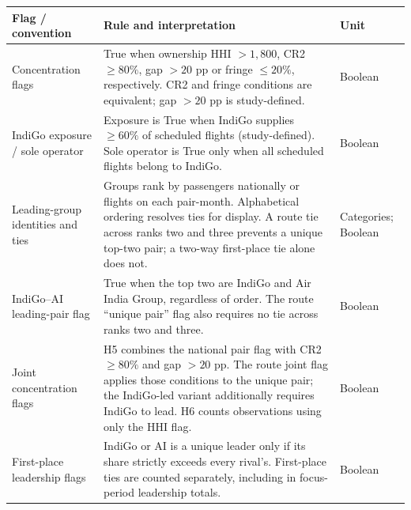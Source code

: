 \begin{minipage}{\linewidth}
\captionsetup{font=small,labelfont=bf,justification=raggedright,singlelinecheck=false,hypcap=false}
\label{tab:o4-dictionary-flags}
\centering
{\footnotesize{}\setlength{\tabcolsep}{4pt}\fontsize{10}{12}\selectfont{}\setlength{\tabcolsep}{3pt}
\renewcommand{\arraystretch}{1.15}
\begin{tabular}{|>{\raggedright\arraybackslash}p{}|>{\raggedright\arraybackslash}p{}|>{\raggedright\arraybackslash}p{}|}
\hline
\textbf{Flag / convention} & \textbf{Rule and interpretation} & \textbf{Unit} \\
\hline
Concentration flags & True when ownership HHI $>1{,}800$, CR2 $\geq80\%$, gap $>20$ pp or fringe $\leq20\%$, respectively. CR2 and fringe conditions are equivalent; gap $>20$ pp is study-defined. & Boolean \\
\hline
IndiGo exposure / sole operator & Exposure is True when IndiGo supplies $\geq60\%$ of scheduled flights (study-defined). Sole operator is True only when all scheduled flights belong to IndiGo. & Boolean \\
\hline
Leading-group identities and ties & Groups rank by passengers nationally or flights on each pair-month. Alphabetical ordering resolves ties for display. A route tie across ranks two and three prevents a unique top-two pair; a two-way first-place tie alone does not. & Categories; Boolean \\
\hline
IndiGo--AI leading-pair flag & True when the top two are IndiGo and Air India Group, regardless of order. The route ``unique pair'' flag also requires no tie across ranks two and three. & Boolean \\
\hline
Joint concentration flags & H5 combines the national pair flag with CR2 $\geq80\%$ and gap $>20$ pp. The route joint flag applies those conditions to the unique pair; the IndiGo-led variant additionally requires IndiGo to lead. H6 counts observations using only the HHI flag. & Boolean \\
\hline
First-place leadership flags & IndiGo or AI is a unique leader only if its share strictly exceeds every rival's. First-place ties are counted separately, including in focus-period leadership totals. & Boolean \\

\end{tabular}}
\end{minipage}
